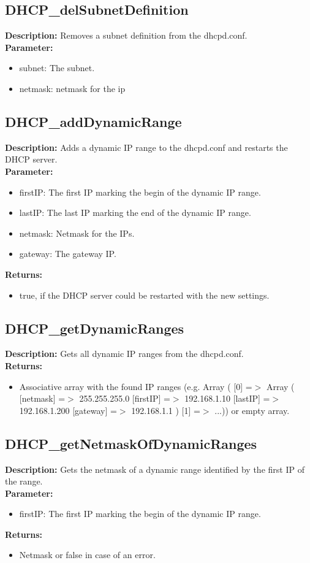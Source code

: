 \subsection{DHCP\_delSubnetDefinition}
\textbf{Description:} Removes a subnet definition from the dhcpd.conf.\\
\textbf{Parameter:}
\begin{itemize}
\item subnet: The subnet.
\item netmask: netmask for the ip
\end{itemize}

\subsection{DHCP\_addDynamicRange}
\textbf{Description:} Adds a dynamic IP range to the dhcpd.conf and restarts the DHCP server.\\
\textbf{Parameter:}
\begin{itemize}
\item firstIP: The first IP marking the begin of the dynamic IP range.
\item lastIP: The last IP marking the end of the dynamic IP range.
\item netmask: Netmask for the IPs.
\item gateway: The gateway IP.
\end{itemize}
\textbf{Returns:}
\begin{itemize}
\item true, if the DHCP server could be restarted with the new settings.
\end{itemize}

\subsection{DHCP\_getDynamicRanges}
\textbf{Description:} Gets all dynamic IP ranges from the dhcpd.conf.\\
\textbf{Returns:}
\begin{itemize}
\item Associative array with the found IP ranges (e.g. Array ( [0] =$>$ Array ( [netmask] =$>$ 255.255.255.0 [firstIP] =$>$ 192.168.1.10 [lastIP] =$>$ 192.168.1.200 [gateway] =$>$ 192.168.1.1 ) [1] =$>$ ...)) or empty array.
\end{itemize}

\subsection{DHCP\_getNetmaskOfDynamicRanges}
\textbf{Description:} Gets the netmask of a dynamic range identified by the first IP of the range.\\
\textbf{Parameter:}
\begin{itemize}
\item firstIP: The first IP marking the begin of the dynamic IP range.
\end{itemize}
\textbf{Returns:}
\begin{itemize}
\item Netmask or false in case of an error.
\end{itemize}


